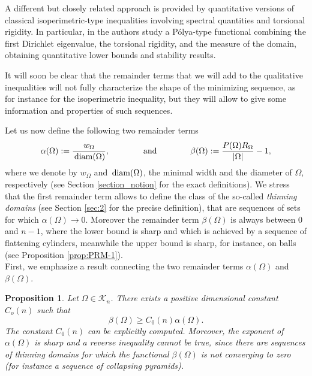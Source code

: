 \documentclass[oneside,a4paper,11pt,notitlepage]{article}
\newcommand{\abs}[1]{{\left|#1\right|}}
\theoremstyle{definition}
\theoremstyle{plain}
\newtheorem{prop}[teorema]{Proposition}
\theoremstyle{definition}
\DeclareMathOperator{\diam}{\, \textup{diam}}
\begin{document}
A different but closely related approach is provided by quantitative versions of classical isoperimetric-type inequalities involving spectral quantities and torsional rigidity. In particular, in \cite{VFNT2016} the authors study a Pólya-type functional combining the first Dirichlet eigenvalue, the torsional rigidity, and the measure of the domain, obtaining quantitative lower bounds and stability results.

It will soon be clear that the remainder terms that we will add to the qualitative inequalities will not fully characterize the shape of the minimizing sequence, as for instance for the isoperimetric inequality, but they will allow to give some information and properties of such sequences.

 Let us now define the  
following two remainder terms 
\begin{equation}\label{eq:remterms}
    \alpha(\Omega):=\frac{w_\Omega}{\diam(\Omega)}, \qquad \qquad \text{and} \qquad \qquad  \beta(\Omega):=\frac{P(\Omega)R_\Omega}{\abs{\Omega}}-1,
\end{equation}
where we denote by $w_\Omega$ and $\diam(\Omega)$, the minimal width and the diameter of $\Omega$, respectively (see Section \ref{section_notion} for the exact definitions). %
We stress that the first remainder term allows to define the class of the so-called \textit{thinning domains} (see Section \ref{sec:2} for the precise definition), that are sequences of sets for which $\alpha(\Omega)\to 0$. Moreover the remainder term $\beta(\Omega)$ is always between $0$ and $n-1$, where the lower bound is sharp and which is achieved by a sequence of flattening cylinders, meanwhile the upper bound is sharp, for instance, on balls (see Proposition \ref{prop:PRM-1}). \\
First, we emphasize a result connecting the two remainder terms $\alpha(\Omega)$ and $\beta(\Omega)$.
\begin{prop}\label{prop:comparisonasymmetries}
     Let $\Omega \in \mathcal{K}_n$. There exists a positive dimensional constant $C_o(n)$ such that
     \begin{equation}\label{eq:PRM-WD}
         \beta(\Omega)\ge C_0(n)\alpha(\Omega).
     \end{equation}
The constant $C_0(n)$ can be explicitly computed. Moreover, the exponent of $\alpha(\Omega)$ is sharp and a reverse inequality cannot be true, since there are sequences of thinning domains for which the functional $\beta(\Omega)$ is not converging to zero (for instance a sequence of collapsing pyramids).
\end{prop}
\end{document}

